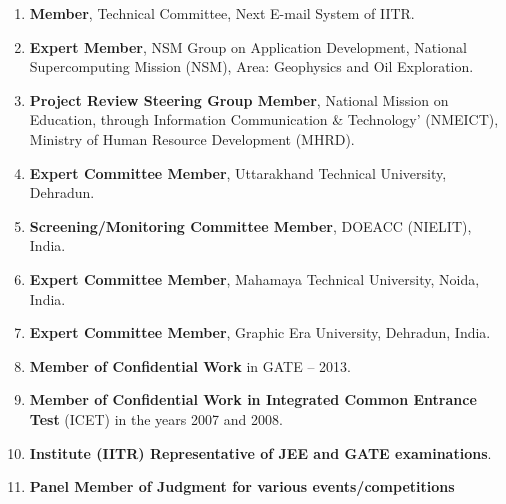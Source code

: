 \begin{enumerate}

\item
\textbf{Member}, Technical Committee, Next E-mail System of IITR.

\item
\textbf{Expert Member}, NSM  Group on Application Development, National Supercomputing Mission (NSM), Area: Geophysics and Oil Exploration.

\item
\textbf{Project  Review Steering Group Member}, National Mission on Education, through Information Communication \& Technology’ (NMEICT), Ministry of Human Resource Development (MHRD).

\item
\textbf{Expert Committee Member}, Uttarakhand Technical University, Dehradun.

\item
\textbf{Screening/Monitoring Committee Member}, DOEACC (NIELIT), India.

\item
\textbf{Expert Committee Member}, Mahamaya Technical University, Noida, India.

\item 
\textbf{Expert Committee Member}, Graphic Era University, Dehradun, India.

\item
\textbf{Member of Confidential Work} in GATE – 2013. 

\item
\textbf{Member of Confidential Work in Integrated Common Entrance Test} (ICET) in the years 2007 and 2008.

\item
\textbf{Institute (IITR) Representative of JEE and GATE examinations}.

\item
\textbf{Panel Member of Judgment for various events/competitions}

\end{enumerate}





